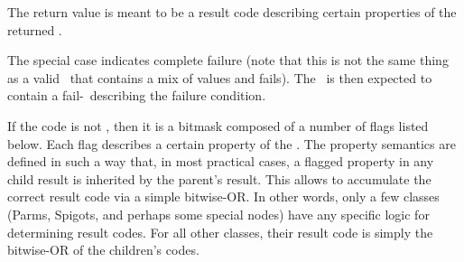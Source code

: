 \documentclass[10pt]{article}
\begin{document}
  The return value is meant to be a result code describing certain properties 
  of the returned \Result. 
  
  The special case  indicates complete failure (note that this is not
  the same thing as a valid \Result\ that contains a mix of values and fails).
  The \Result\ is then expected to contain a fail-\VellSet\ describing the
  failure condition. 

  If the code is not , then it is a bitmask composed of a number of
  flags listed below. Each flag describes a certain property of the \Result.
  The property semantics are defined in such a way that, in most practical
  cases, a flagged property in any child result is inherited by the parent's
  result. This allows  to accumulate the correct result code via
  a simple bitwise-OR. In other words, only a few classes (Parms, Spigots, and
  perhaps some special nodes) have any specific logic for determining result
  codes. For all other  classes, their result code is simply the bitwise-OR of
  the children's codes.
\end{document}
